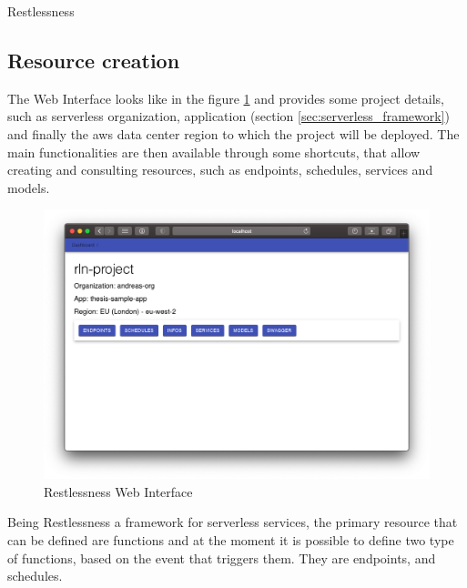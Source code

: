 \begin{chapter}{Restlessness}
    \subsection{Resource creation}
    The Web Interface looks like in the figure \ref{fig:rln_web_interface} and
    provides some project details, such as serverless organization, application
    (section \ref{sec:serverless_framework}) and finally the aws data center
    region to which the project will be deployed.
    The main functionalities are then available through some shortcuts, that allow
    creating and consulting resources, such as endpoints, schedules, services and
    models.

    \begin{figure}
        \centering
        \includegraphics[width=\linewidth]{source/images/rln-web-interface.png}
        \caption{Restlessness Web Interface}
        \label{fig:rln_web_interface}
    \end{figure}

    Being Restlessness a framework for serverless services, the primary resource
    that can be defined are functions and at the moment it is possible to define
    two type of functions, based on the event that triggers them. They are endpoints,
    and schedules.


\end{chapter}
